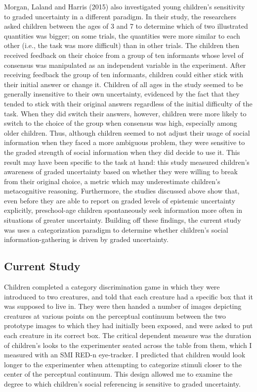 \documentclass[man]{apa6}
\theoremstyle{definition}
\theoremstyle{definition}
\theoremstyle{definition}
\theoremstyle{remark}
\begin{document}
Morgan, Laland and Harris (2015) also investigated young children's
sensitivity to graded uncertainty in a different paradigm. In their
study, the researchers asked children between the ages of 3 and 7 to
determine which of two illustrated quantities was bigger; on some
trials, the quantities were more similar to each other (i.e., the task
was more difficult) than in other trials. The children then received
feedback on their choice from a group of ten informants whose level of
consensus was manipulated as an independent variable in the experiment.
After receiving feedback the group of ten informants, children could
either stick with their initial answer or change it. Children of all
ages in the study seemed to be generally insensitive to their own
uncertainty, evidenced by the fact that they tended to stick with their
original answers regardless of the initial difficulty of the task. When
they did switch their answers, however, children were more likely to
switch to the choice of the group when consensus was high, especially
among older children. Thus, although children seemed to not adjust their
usage of social information when they faced a more ambiguous problem,
they were sensitive to the graded strength of social information when
they did decide to use it. This result may have been specific to the
task at hand: this study measured children's awareness of graded
uncertainty based on whether they were willing to break from their
original choice, a metric which may underestimate children's
metacognitive reasoning. Furthermore, the studies discussed above show
that, even before they are able to report on graded levels of epistemic
uncertainty explicitly, preschool-age children spontaneously seek
information more often in situations of greater uncertainty. Building
off these findings, the current study was uses a categorization paradigm
to determine whether children's social information-gathering is driven
by graded uncertainty.

\subsection{Current Study}\label{current-study}

Children completed a category discrimination game in which they were
introduced to two creatures, and told that each creature had a specific
box that it was supposed to live in. They were then handed a number of
images depicting creatures at various points on the perceptual continuum
between the two prototype images to which they had initially been
exposed, and were asked to put each creature in its correct box. The
critical dependent measure was the duration of children's looks to the
experimenter seated across the table from them, which I measured with an
SMI RED-n eye-tracker. I predicted that children would look longer to
the experimenter when attempting to categorize stimuli closer to the
center of the perceptual continuum. This design allowed me to examine
the degree to which children's social referencing is sensitive to graded
uncertainty.
\end{document}
